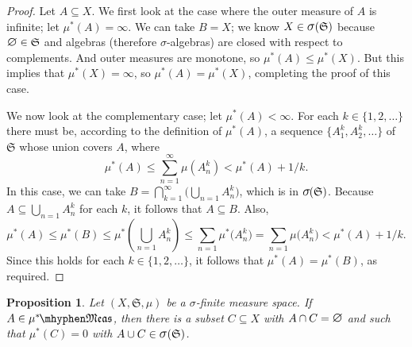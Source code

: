 \documentclass[
twoside=true,
paper=letter,
fontsize=11pt,
pagesize=auto,
leqno,
openany,
headsepline,
overfullrule,
]{scrbook}
\theoremstyle{plain}
\theoremstyle{plain}
\newtheorem{prop}[thm]{Proposition}
\theoremstyle{definition}
\theoremstyle{bfnoteitalic}
\theoremstyle{bfnoteroman}
\newcommand{\sigalg}[1]{\mathfrak{#1}}
\newcommand{\sagb}{\mathop{\hbox{\large{$\sigma$}}}\nolimits}
\newcommand{\textsigma}{\hbox{\large{$\sigma$}}\kern-1pt}
\newcommand{\mtset}{\hbox{\large{$\varnothing$}}}
\newcommand{\meets}{\cap}
\newcommand{\semiring}{\sigalg{S}}
\newcommand{\measurable}[1]{{#1}\mhyphen\mathfrak{Meas}}
\newcommand{\kernast}{\ast\kern-1pt}
\newcommand{\measurespace}{X}
\newcommand{\measure}{\mu}
\begin{document}
\begin{proof}
Let $A\subseteq\measurespace$. 
We first look at the case where the outer measure of $A$  is infinite; let $\measure^*(A)=\infty$. We can take $B=\measurespace$; we know $\measurespace\in \sagb(\semiring)$ because $\mtset \in \semiring$ and algebras 
(therefore \textsigma-algebras) are closed with respect to complements.  And outer measures are monotone, so $\measure^*(A) \leq \measure^*(\measurespace)$. But this implies that $\measure^*(\measurespace)=\infty$, so $\measure^*(A) = \measure^*(\measurespace)$, completing the proof of this case.

We now look at the complementary case; let $\measure^*(A) < \infty$. For each $k\in\{1,2,\ldots\}$ there must be, according to the definition of $\measure^*(A)$, a sequence $\{A^k_1, A^k_2, \ldots \}$ of $\semiring$ whose union covers $A$, where
\[
\measure^*(A)\leq \sum_{n=1}^\infty\measure(A^k_n) < \measure^*(A) + 1/k.
\] 
In this case, we can take 
$B= \bigcap_{k=1}^\infty \bigl( \bigcup_{n = 1} A^k_n \bigr)$, which is in $\textsigma(\semiring)$. Because $A\subseteq \bigcup_{n = 1} A^k_n$ for each $k$, it follows that $A\subseteq B$.
Also, 
\[
\measure^*(A) \leq \measure^*(B) 
\leq \measure^*\left(\bigcup_{n = 1} A^k_n \right) 
\leq \sum_{n = 1} \measure^* \bigl( A^k_n \bigr)
= \sum_{n = 1} \measure \bigl( A^k_n \bigr)
< \measure^*(A) + 1/k.
\]
Since this holds for each $k\in\{1,2,\ldots\}$, it follows that $\measure^*(A) = \measure^*(B)$, as required.
\end{proof}





\begin{prop}\label{approximation_sigma_finite}
Let $(\measurespace, \semiring, \measure)$ be a \textsigma-finite measure space. If 
$A\in\measurable{\measure^\kernast}$, then there is a subset $C\subseteq\measurespace$ with $A\meets C =\mtset$ and  such that $\measure^*(C) = 0$ with $A\cup C\in \sagb(\semiring)$. 
\end{prop}
\end{document}
